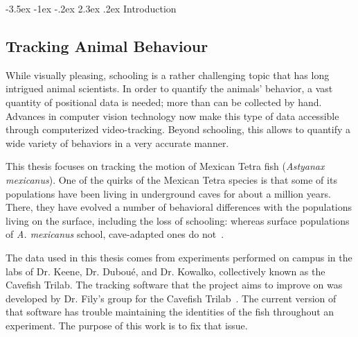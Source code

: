 \documentclass{article}
\makeatletter
\renewcommand\section{\clearpage\newpage\@startsection {section}{1}{\z@}%
	{-3.5ex \@plus -1ex \@minus -.2ex}%
	{2.3ex \@plus.2ex}%
	{\normalfont\Large\bfseries}}
\makeatother
\begin{document}

\tableofcontents


\listoffigures

\newpage


\setlength{\parindent}{1em}



\section{Introduction}

\subsection{Tracking Animal Behaviour}
While visually pleasing, schooling is a rather challenging topic that has long intrigued animal scientists. In order to quantify the animals' behavior, a vast quantity of positional data is needed; more than can be collected by hand. Advances in computer vision technology now make this type of data accessible through computerized video-tracking. Beyond schooling, this allows to quantify a wide variety of behaviors in a very accurate manner.

This thesis focuses on tracking the motion of Mexican Tetra fish (\textit{Astyanax mexicanus}). One of the quirks of the Mexican Tetra species is that some of its populations have been living in underground caves for about a million years. There, they have evolved a number of behavioral differences with the populations living on the surface, including the loss of schooling: whereas surface populations of \emph{A. mexicanus} school, cave-adapted ones do not~\cite{kowalko_utilizing_2020}. 

The data used in this thesis comes from experiments performed on campus in the labs of Dr. Keene, Dr. Dubou\'e, and Dr. Kowalko, collectively known as the Cavefish Trilab. The tracking software that the project aims to improve on was developed by Dr. Fily's group for the Cavefish Trilab~\cite{patch_kinematic_2020}. The current version of that software has trouble maintaining the identities of the fish throughout an experiment. The purpose of this work is to fix that issue.
\end{document}
